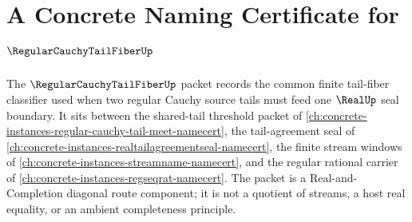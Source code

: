 \chapter{A Concrete Naming Certificate for $\RegularCauchyTailFiberUp$}
\label{ch:concrete-instances-regular-cauchy-tail-fiber-namecert}

The $\RegularCauchyTailFiberUp$ packet records the common finite tail-fiber classifier used when two regular Cauchy source tails must feed one $\RealUp$ seal boundary. It sits between the shared-tail threshold packet of \autoref{ch:concrete-instances-regular-cauchy-tail-meet-namecert}, the tail-agreement seal of \autoref{ch:concrete-instances-realtailagreementseal-namecert}, the finite stream windows of \autoref{ch:concrete-instances-streamname-namecert}, and the regular rational carrier of \autoref{ch:concrete-instances-regseqrat-namecert}. The packet is a Real-and-Completion diagonal route component; it is not a quotient of streams, a host real equality, or an ambient completeness principle.



